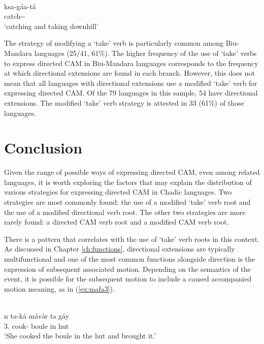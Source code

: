 \ea\label{ex:lama12}
 \\
\gll ksa-gáa-tá	\\
catch--		\\
\glt `catching and taking downhill'
\z 

The strategy of modifying a `take' verb is particularly common among Biu-Mandara languages (25/41, 61\%). The higher frequency of the use of `take' verbs to express directed CAM in Biu-Mandara languages corresponds to the frequency at which directional extensions are found in each branch. However, this does not mean that all languages with directional extensions use a modified `take' verb for expressing directed CAM. Of the 79 languages in this sample, 54 have directional extensions. The modified `take' verb strategy is attested in 33 (61\%) of those languages.

\section{Conclusion}

Given the range of possible ways of expressing directed CAM, even among related languages, it is worth exploring the factors that may explain the distribution of various strategies for expressing directed CAM in Chadic languages. Two strategies are most commonly found: the use of a modified `take' verb root and the use of a modified directional verb root. The other two strategies are more rarely found: a directed CAM verb root and a modified CAM verb root. 

There is a pattern that correlates with the use of `take' verb roots in this context. As discussed in Chapter \ref{ch:functions}, directional extensions are typically multifunctional and one of the most common functions alongside direction is the expression of subsequent associated motion. Depending on the semantics of the event, it is possible for the subsequent motion to include a caused accompanied motion meaning, as in (\ref{ex:mafa3}).

\ea\label{ex:mafa3}
 \\
\gll  n ta-ká mávə́r tə gáy	\\
3. cook- boule in hut \\
\glt `She cooked the boule in the hut and brought it.' 
\z

